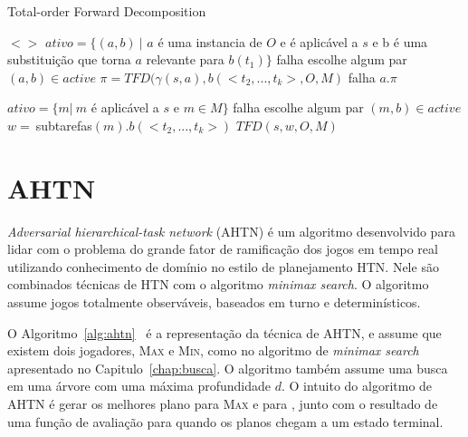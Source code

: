 \begin{algorithm}
	\caption{Total-order Forward Decomposition}
	\label{alg:tfd}
	\begin{algorithmic}[1]		
				\State	\Return $<>$
			\EndIf
				\State $ativo = \{(a, b)~ |$ $a$ é uma instancia de $O$ e é aplicável a $s$ e b é uma substituição que torna $a$ relevante para $b(t_{1})\}$
					\State \Return falha
				\EndIf
				\State escolhe algum par $(a, b) \in active$
				\State $\pi = TFD(\gamma(s, a), b(<t_{2}, ..., t_{k}>, O, M)$
					\State \Return falha
				\Else 
					\State \Return $a . \pi$
			\EndIf
			
				\State $ativo = \{m |~ m$ é aplicável a $s$ e $m \in M\}$
					\State \Return falha
				\EndIf
				\State escolhe algum par $(m, b) \in active$
				\State $w =~ $subtarefas$(m).b(<t_{2}, ..., t_{k}>)$
				\State \Return $TFD(s, w, O, M)$
				\EndIf
		\EndFunction
	\end{algorithmic}
\end{algorithm}

\section{AHTN} 

\textit{Adversarial hierarchical-task network} (AHTN) é um algoritmo desenvolvido para lidar com o problema do grande fator de ramificação dos jogos em tempo real~\cite{ontanon2015adversarial} utilizando conhecimento de domínio no estilo de planejamento HTN. 
Nele são combinados técnicas de HTN com o algoritmo \textit{minimax search}. 
O algoritmo assume jogos totalmente observáveis, baseados em turno e determinísticos. 

O Algoritmo~\ref{alg:ahtn}~\cite{ontanon2015adversarial} é a representação da técnica de AHTN, e assume que existem dois jogadores, \textsc{Max} e \textsc{Min}, como no algoritmo de \textit{minimax search} apresentado no Capitulo~\ref{chap:busca}.
O algoritmo também assume uma busca em uma árvore com uma máxima profundidade $d$. 
O intuito do algoritmo de AHTN é gerar os melhores plano para \textsc{Max} e para , junto com o resultado de uma função de avaliação para quando os planos chegam a um estado terminal. 

